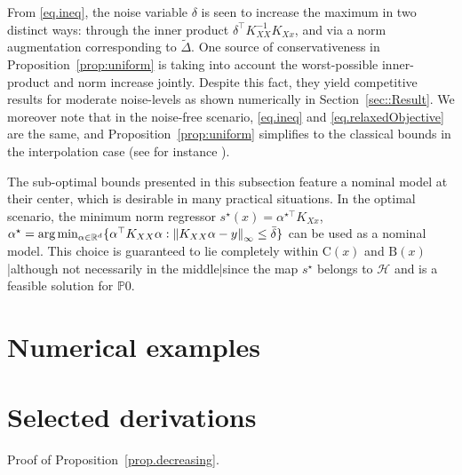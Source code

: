 From \eqref{eq.ineq}, the noise variable $\delta$ is seen to increase the maximum in two distinct ways: through the inner product $\delta^\top K_{XX}^{-1}K_{Xx}$, and via a norm augmentation corresponding to $\tilde\Delta$. One source of conservativeness in Proposition~\ref{prop:uniform} is taking into account the worst-possible inner-product and norm increase jointly. Despite this fact, they yield competitive results for moderate noise-levels as shown numerically in Section~\ref{sec::Result}. We moreover note that in the noise-free scenario, \eqref{eq.ineq} and \eqref{eq.relaxedObjective} are the same, and Proposition~\ref{prop:uniform} simplifies to the classical bounds in the interpolation case (see for instance \cite{fasshauer2011positive}).

\begin{remark}
	The sub-optimal bounds presented in this subsection feature a nominal model at their center, which is desirable in many practical situations. In the optimal scenario, the minimum norm regressor $s^\star(x) = \alpha^{\star\top} K_{Xx}$, $\alpha^\star = \text{arg}\min_{\alpha \in \mathbb{R}^d} \{ \alpha^\top K_{XX} \alpha : \left\| K_{XX} \alpha - y \right\|_\infty \leq \bar\delta \}$ can be used as a nominal model. This choice is guaranteed to lie completely within $\text{C}(x)$ and $\text{B}(x)$|although not necessarily in the middle|since the map $s^\star$ belongs to $\mathcal{H}$ and is a feasible solution for $\mathds{P}0$.
\end{remark}

\section{Numerical examples}

\section{Selected derivations}
\label{sec.selected_derivations}

Proof of Proposition~\ref{prop.decreasing}.

